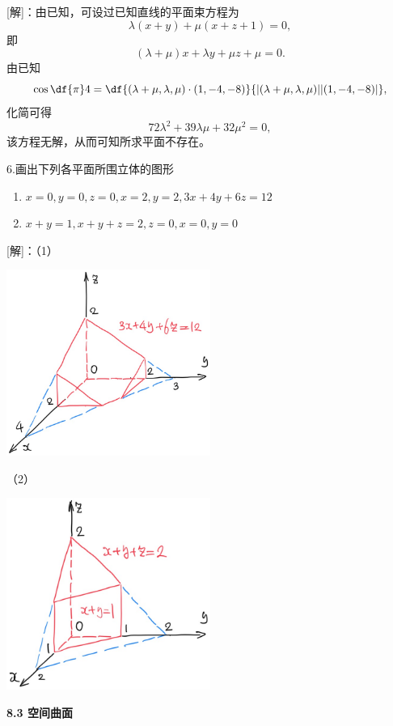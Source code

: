 [解]：由已知，可设过已知直线的平面束方程为
$$\lambda(x+y)+\mu(x+z+1)=0,$$
即
$$(\lambda+\mu)x+\lambda y+\mu z+\mu=0.$$
由已知
$$\cos\df{\pi}4=\df{(\lambda+\mu,\lambda,\mu)\cdot
(1,-4,-8)}{|(\lambda+\mu,\lambda,\mu)||(1,-4,-8)|},$$
化简可得
$$72\lambda^2+39\lambda\mu+32\mu^2=0,$$
该方程无解，从而可知所求平面不存在。
\fin

\bs

6.画出下列各平面所围立体的图形
  \begin{enumerate}[(1)]
    \setlength{\itemindent}{1cm}
    \item $x=0,y=0,z=0,x=2,y=2,3x+4y+6z=12$
    \item $x+y=1,x+y+z=2,z=0,x=0,y=0$
  \end{enumerate}

[解]：（1）
\begin{center}
	\includegraphics[width=0.5\textwidth]{./images/ch8/xyz12.jpg}
\end{center}

（2）
\begin{center}
	\includegraphics[width=0.5\textwidth]{./images/ch8/xyz2.jpg}
\end{center}

\bs

\begin{center}
	\bf 8.3 空间曲面
\end{center}

